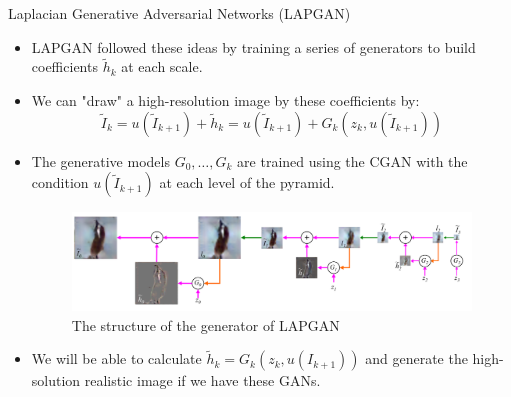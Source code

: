 \documentclass[10pt]{beamer}
\begin{document}
	\begin{frame}{Laplacian Generative Adversarial Networks (LAPGAN)}
		\begin{itemize}
			\item LAPGAN followed these ideas by training a series of generators to build coefficients $\tilde{h}_k$ at each scale.
			\onslide<1->
			\item We can "draw" a high-resolution image by these coefficients by:
			\onslide<2->
			$$
			\tilde{I}_k=u(\tilde{I}_{k+1})+\tilde{h}_k=u(\tilde{I}_{k+1})+G_k(z_k,u(\tilde{I}_{k+1}))
			$$
			
			\item The generative models ${G_0,\dots,G_k}$ are trained using the CGAN with the condition $u(\tilde{I}_{k+1})$ at each level of the pyramid.
			\onslide<4->
			\begin{figure}
				\includegraphics<4->[width=30em]{figures/LAPGAN-generator-structure.png}
				\caption{The structure of the generator of LAPGAN}
			\end{figure}
			\item We will be able to calculate $\tilde{h}_k=G_k(z_k,u(I_{k+1}))$ and generate the high-solution realistic image if we have these GANs.
		\end{itemize}
	\end{frame}
\end{document}

